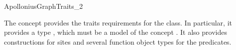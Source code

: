 

\begin{ccRefConcept}{ApolloniusGraphTraits_2}

\ccDefinition
  
The concept  provides the traits
requirements for the  class. In particular,
it provides a type , which must be a model of the concept
. It also provides
constructions for sites and several function object
types for the predicates.


\end{ccRefConcept}
